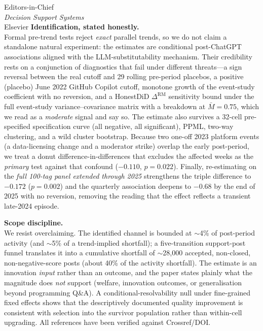 \documentclass[12pt]{letter}
\begin{document}
\begin{letter}{Editors-in-Chief \\ \emph{Decision Support Systems} \\ Elsevier}
\noindent\textbf{Identification, stated honestly.}\\
Formal pre-trend tests reject \emph{exact} parallel trends,
so we do not claim a standalone natural experiment: the
estimates are conditional post-ChatGPT associations aligned
with the LLM-substitutability mechanism. Their credibility
rests on a conjunction of diagnostics that fail under
different threats---a sign reversal between the real cutoff
and 29 rolling pre-period placebos, a positive (placebo)
June 2022 GitHub Copilot cutoff, monotone growth of the
event-study coefficient with no reversion, and a HonestDiD
$\Delta^{\text{RM}}$ sensitivity bound under the full
event-study variance--covariance matrix with a breakdown at
$\bar M = 0.75$, which we read as a \emph{moderate} signal
and say so. The estimate also survives a 32-cell
pre-specified specification curve (all negative, all
significant), PPML, two-way clustering, and a wild cluster
bootstrap. Because two one-off 2023 platform events (a
data-licensing change and a moderator strike) overlap the
early post-period, we treat a donut difference-in-differences
that excludes the affected weeks as the \emph{primary} test
against that confound ($-0.110$, $p=0.022$). Finally,
re-estimating on the \emph{full 100-tag panel extended
through 2025} strengthens the triple difference to $-0.172$
($p=0.002$) and the quarterly association deepens to $-0.68$
by the end of 2025 with no reversion, removing the reading
that the effect reflects a transient late-2024 episode.

\noindent\textbf{Scope discipline.}\\
We resist overclaiming. The identified channel is bounded at
$\sim$4\% of post-period activity (and $\sim$5\% of a
trend-implied shortfall); a five-transition support-post
funnel translates it into a cumulative shortfall of
$\sim$28{,}000 accepted, non-closed, non-negative-score posts
(about 40\% of the activity shortfall). The estimate is an
innovation \emph{input} rather than an outcome, and the paper
states plainly what the magnitude does \emph{not} support
(welfare, innovation outcomes, or generalisation beyond
programming Q\&A). A conditional-resolvability null under
fine-grained fixed effects shows that the descriptively
documented quality improvement is consistent with selection
into the survivor population rather than within-cell
upgrading. All references have been verified against
Crossref/DOI.


\end{letter}
\end{document}
